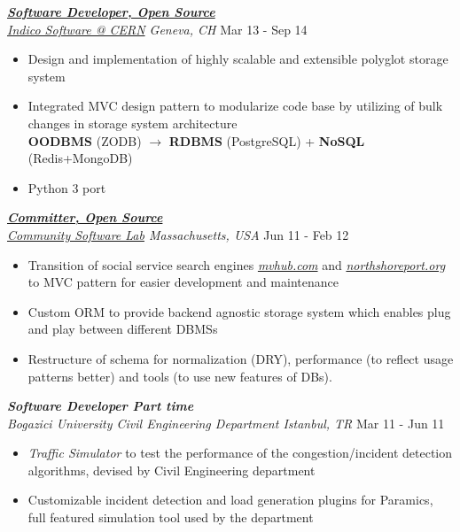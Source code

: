 \documentclass[line, margin]{res}
\begin{document}
\begin{resume}
  {\sl \textbf{\href{http://indico-software.org/}{Software Developer, Open Source}} \\ \href{http://indico.cern.ch/}{Indico Software @ CERN} Geneva, CH} \hfill Mar 13 - Sep 14 \\
  \vspace{-0.3cm}
  \begin{itemize}
    \item Design and implementation of highly scalable and extensible polyglot storage system
    \item Integrated MVC design pattern to modularize code base by utilizing of bulk changes in storage system architecture \\ \textbf{OODBMS} (ZODB) $\rightarrow$ \textbf{RDBMS} (PostgreSQL) + \textbf{NoSQL} (Redis+MongoDB)
    \item Python 3 port
  \end{itemize}

	{\sl \textbf{\href{https://launchpad.net/mvhub}{Committer, Open Source}} \\ \href{http://thecsl.org/}{Community Software Lab} Massachusetts, USA} \hfill Jun 11 - Feb 12 \\
	\vspace{-0.3cm}
	\begin{itemize} \itemsep -2pt
		\item Transition of social service search engines \textit{\href{http://mvhub.com/}{mvhub.com}} and \textit{\href{http://northshoreport.org/}{northshoreport.org}} to MVC pattern for easier development and maintenance
		\item Custom ORM to provide backend agnostic storage system which enables plug and play between different DBMSs
		\item Restructure of schema for normalization (DRY), performance (to reflect usage patterns better) and tools (to use new features of DBs).
	\end{itemize}

	{\sl \textbf{Software Developer Part time} \\ Bogazici University Civil Engineering Department Istanbul, TR} \hfill Mar 11 - Jun 11 \\
	\vspace{-0.3cm}
	\begin{itemize} \itemsep -2pt
		\item \textit{Traffic Simulator} to test the performance of the congestion/incident detection algorithms, devised by Civil Engineering department
		\item Customizable incident detection and load generation plugins for Paramics, full featured simulation tool used by the department
	\end{itemize}


\end{resume}
\end{document}
